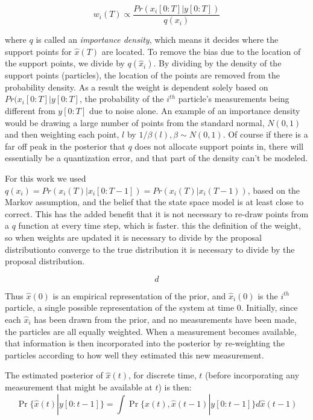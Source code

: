 \documentclass{article}
\begin{document}
\begin{equation}
w_i(T) \propto \frac{Pr(x_i[0:T] | y[0:T])}{q(x_i)}
\end{equation}

where $q$ is called an \emph{importance density}, which means it decides where
the support points for $\hat{x}(T)$ are located. To remove the bias due to the
location of the support points, we divide by $q(\hat{x}_i)$. By dividing by 
the density of the support points (particles), the location of the points are removed
from the probability density. As a result the weight is dependent solely based
on $Pr(x_i[0:T] | y[0:T]$, the probability of the $i^{th}$ particle's measurements
being different from $y[0:T]$ due to noise alone.
An example of an importance density would be drawing a large
number of points from the standard normal, $N(0,1)$ and then weighting each point, $l$ by 
$1/\beta(l), \beta \sim N(0,1)$. Of course if there is a far off peak in
the posterior that $q$ does not allocate support points in, there will essentially
be a quantization error, and that part of the density can't be modeled. 

For this work we used $q(x_i) = Pr(x_i(T) | x_i[0:T-1]) = Pr(x_i(T) | x_i(T-1))$,
based on the Markov assumption, and the belief that the state space model is 
at least close to correct.  
This has the added benefit that it is not necessary to
re-draw points from a $q$ function at every time step, which is faster. 
this the definition of the weight, so when weights are updated it is necessary
to divide by the proposal distributionto converge
to the true distribution it is necessary to divide by the proposal distribution.


\begin{equation}
  d
\end{equation}

Thus $\hat{x}(0)$ is an empirical representation of the prior, and $\hat{x}_i(0)$
is the $i^{th}$ particle, a single possible representation of the system at time 0.
Initially, since each $\hat{x}_i$ has been drawn from the prior, and no measurements
have been made, the particles are all equally weighted. When a measurement becomes
available, that information is then incorporated into the posterior by re-weighting
the particles according to how well they estimated this new measurement. 

The estimated posterior of $\hat{x}(t)$, for discrete time, $t$ (before incorporating
any measurement that might be available at $t$) is then:
\begin{equation}
\Pr\{\hat{x}(t) | y[0:t-1]\} =  \int \Pr\{\hat{x}(t), \hat{x}(t-1) | y[0:t-1]\} d\hat{x}(t-1)
\end{equation}
\end{document}
